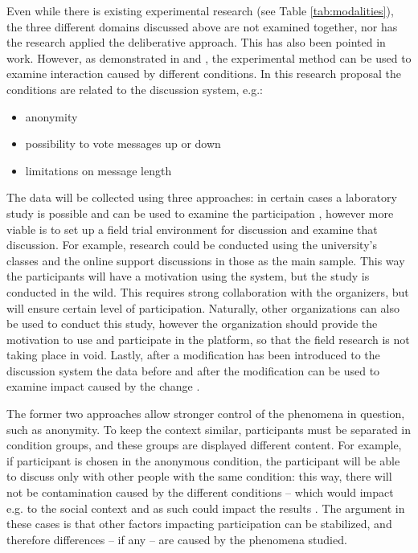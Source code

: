 \documentclass{article}
\begin{document}
Even while there is existing experimental research (see Table \ref{tab:modalities}), the three different domains discussed above are not examined together, nor has the research applied the deliberative approach. This has also been pointed in  work. However, as demonstrated in  and , the experimental method can be used to examine interaction caused by different conditions. In this research proposal the conditions are related to the discussion system, e.g.:

\begin{itemize}
\item anonymity
\item possibility to vote messages up or down
\item limitations on message length
\end{itemize}

The data will be collected using three approaches: in certain cases a laboratory study is possible and can be used to examine the participation , however more viable is  to set up a field trial environment for discussion and examine that discussion. For example, research could be conducted using the university's classes and the online support discussions in those as the main sample. This way the participants will have a motivation using the system, but the study is conducted in the wild. This requires strong collaboration with the organizers, but will ensure certain level of participation. Naturally, other organizations can also be used to conduct this study, however the organization should provide the motivation to use and participate in the platform, so that the field research is not taking place in void. Lastly, after a modification has been introduced to the discussion system the data before and after the modification can be used to examine impact caused by the change .

The former two approaches allow stronger control of the phenomena in question, such as anonymity. To keep the context similar, participants must be separated in condition groups, and these groups are displayed different content. For example, if participant is chosen in the anonymous condition, the participant will be able to discuss only with other people with the same condition: this way, there will not be contamination caused by the different conditions -- which would impact e.g. to the social context and as such could impact the results \cite{sukumaran11}. The argument in these cases is that other factors impacting participation can be stabilized, and therefore differences -- if any -- are caused by the phenomena studied.
\end{document}
